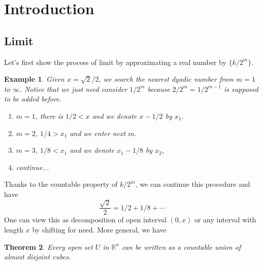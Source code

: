 \documentclass[dvipsnames]{article}
\numberwithin{equation}{section}
\newtheorem{Theorem}{Theorem}[section] %
\newtheorem{Example}[Theorem]{Example}
\newcommand{\Rn}{\mathbb{R}^{n}}
\begin{document}
\large



\section{Introduction}

\subsection{Limit}
Let's first show the process of limit by approximating a real number by $\{k/2^{m}\}$.
\begin{Example}
    Given $x=\sqrt{2}/2$, we search the nearest dyadic number from $m=1$ to $\infty$. Notice that we just need consider $1/2^{m}$ because $2/2^{m}=1/2^{m-1}$ is supposed to be added before.
    \begin{enumerate}
        \item $m=1$, there is $1/2<x$ and we denote $x-1/2$ by $x_{1}$.
        \item $m=2$, $1/4>x_{1}$ and we enter next $m$.
        \item $m=3$, $1/8<x_{1}$ and we denote $x_{1}-1/8$ by $x_{2}$,
        \item continue...
    \end{enumerate}
\end{Example}
Thanks to the countable property of $k/2^{m}$, we can continue this procedure and have
$$
\frac{\sqrt{2}}{2}=1/2+1/8+\cdots
$$
One can view this as decomposition of open interval $(0,x)$ or any interval with length $x$ by shifting for need. More general, we have
\begin{Theorem}
    Every open set $U$ in $\Rn$ can be written as a countable union of almost disjoint cubes.
\end{Theorem}
\end{document}

